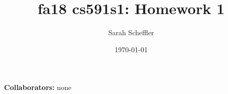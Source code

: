 \documentclass{article}
\title{fa18 cs591s1: Homework 1}
\author{Sarah Scheffler}
\date{\today}
\begin{document}
\maketitle
\textbf{Collaborators: } none




\end{document}
